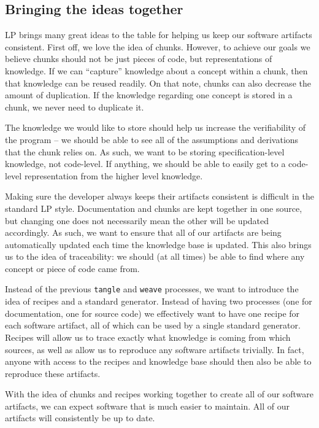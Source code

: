 \documentclass[preprint, 10pt]{sigplanconf}
\begin{document}
\subsection{Bringing the ideas together}
\label{subsec:ideas}

LP brings many great ideas to the table for helping us keep our software
artifacts consistent. First off, we love the idea of chunks. However, to achieve
our goals we believe chunks should not be just pieces of code, but
representations of knowledge. If we can ``capture'' knowledge about a concept
within a chunk, then that knowledge can be reused readily. On that note, chunks
can also decrease the amount of duplication. If the knowledge regarding one
concept is stored in a chunk, we never need to duplicate it.

The knowledge we would like to store should help us increase the
verifiability of the program -- we should be able to see all of the assumptions
and derivations that the chunk relies on. As such, we want to be storing
specification-level knowledge, not code-level. If anything, we should be able to
easily get to a code-level representation from the higher level knowledge.

Making sure the developer always keeps their artifacts consistent is difficult
in the standard LP style. Documentation and chunks are kept together in one
source, but changing one does not necessarily mean the other will be updated
accordingly. As such, we want to ensure that all of our artifacts are being
automatically updated each time the knowledge base is updated. This
also brings us to the idea of traceability: we should (at all times) be able to
find where any concept or piece of code came from.

Instead of the previous \verb|tangle| and \verb|weave| processes, we want to
introduce the idea of recipes and a standard generator. Instead of having two
processes (one for documentation, one for source code) we effectively want to
have one recipe for each software artifact, all of which can be used by a single
standard generator. Recipes will allow us to trace exactly what knowledge is
coming from which sources, as well as allow us to reproduce any software
artifacts trivially. In fact, anyone with access to the recipes and knowledge
base should then also be able to reproduce these artifacts.

With the idea of chunks and recipes working together to create all of our
software artifacts, we can expect software that is much easier to maintain. All
of our artifacts will consistently be up to date.
\end{document}
